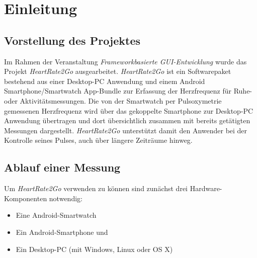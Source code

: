 \newpage
\section{Einleitung}
\label{sec:Einleitung}

\subsection{Vorstellung des Projektes}
\label{sec:Vorstellung des Projektes}
Im Rahmen der Veranstaltung \textit{Frameworkbasierte GUI-Entwicklung} wurde das Projekt \textit{HeartRate2Go} ausgearbeitet. \textit{HeartRate2Go} ist ein Softwarepaket bestehend aus einer Desktop-PC Anwendung und einem Android Smartphone/Smartwatch App-Bundle zur Erfassung der Herzfrequenz für Ruhe- oder Aktivitätsmessungen. Die von der Smartwatch per Pulsoxymetrie gemessenen Herzfrequenz wird über das gekoppelte Smartphone zur Desktop-PC Anwendung übertragen und dort übersichtlich zusammen mit bereits getätigten Messungen dargestellt. \textit{HeartRate2Go} unterstützt damit den Anwender bei der Kontrolle seines Pulses, auch über längere Zeiträume hinweg.

\subsection{Ablauf einer Messung}

Um \textit{HeartRate2Go} verwenden zu können sind zunächst drei Hardware-Komponenten notwendig:
\begin{itemize}
	\item Eine Android-Smartwatch
	\item Ein Android-Smartphone und
	\item Ein Desktop-PC (mit Windows, Linux oder OS X)
\end{itemize}


